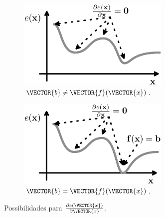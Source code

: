 \begin{myproofT}
\begin{figure}[!h]
     \centering
     \begin{subfigure}[b]{0.48\textwidth}
         \centering
         \includegraphics[width=0.8\textwidth]{chapters/minimization-fx/minimoex2.eps}
         \caption{$\VECTOR{b} \neq \VECTOR{f}(\VECTOR{x})$.}
         \label{fig:ex0b}
     \end{subfigure}
     \hfill
     \begin{subfigure}[b]{0.48\textwidth}
         \centering
         \includegraphics[width=0.8\textwidth]{chapters/minimization-fx/minimoex1.eps}
         \caption{$\VECTOR{b} = \VECTOR{f}(\VECTOR{x})$.}
         \label{fig:ex0a}
     \end{subfigure}
        \caption{Possibilidades para $\frac{\partial e(\VECTOR{x})}{\partial \VECTOR{x} }$.}
        \label{fig:ex0}
\end{figure}



\end{myproofT}
